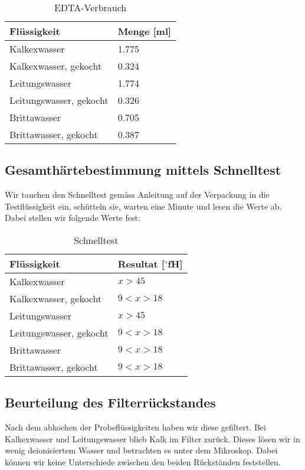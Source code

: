 \documentclass[10pt,oneside,a4paper,fleqn]{article}
\begin{document}
\begin{table}[!h]
\caption{EDTA-Verbrauch}
\label{tab:edtaverbrauch}
\centering
	\begin{tabular}{|l|l|}
		\hline
		Flüssigkeit & Menge [ml] \\
		\hline
		Kalkexwasser & 1.775 \\
		\hline
		Kalkexwasser, gekocht & 0.324 \\
		\hline
		Leitungswasser & 1.774 \\
		\hline
		Leitungswasser, gekocht & 0.326 \\
		\hline
		Brittawasser & 0.705 \\
		\hline
		Brittawasser, gekocht & 0.387 \\
		\hline
	\end{tabular}
\end{table}

\subsection{Gesamthärtebestimmung mittels Schnelltest}
Wir tauchen den Schnelltest gemäss Anleitung auf der Verpackung in die
Testflüssigkeit ein, schütteln sie, warten eine Minute und lesen die Werte ab.
Dabei stellen wir folgende Werte fest:

\begin{table}[!h]
\caption{Schnelltest}
\label{tab:schnelltest}
\centering
	\begin{tabular}{|l|l|}
		\hline
		Flüssigkeit & Resultat [$^\circ$fH] \\
		\hline
		Kalkexwasser & $x>45$ \\
		\hline
		Kalkexwasser, gekocht & $9<x>18$ \\
		\hline
		Leitungswasser & $x>45$ \\
		\hline
		Leitungswasser, gekocht & $9<x>18$ \\
		\hline
		Brittawasser & $9<x>18$ \\
		\hline
		Brittawasser, gekocht & $9<x>18$ \\
		\hline
	\end{tabular}
\end{table}

\subsection{Beurteilung des Filterrückstandes}
Nach dem abkochen der Probeflüssigkeiten haben wir diese gefiltert. Bei
Kalkexwasser und Leitungswasser blieb Kalk im Filter zurück. Dieses lösen wir in
wenig deionisiertem Wasser und betrachten es unter dem Mikroskop.
Dabei können wir keine Unterschiede zwischen den beiden Rückständen feststellen.
\end{document}
